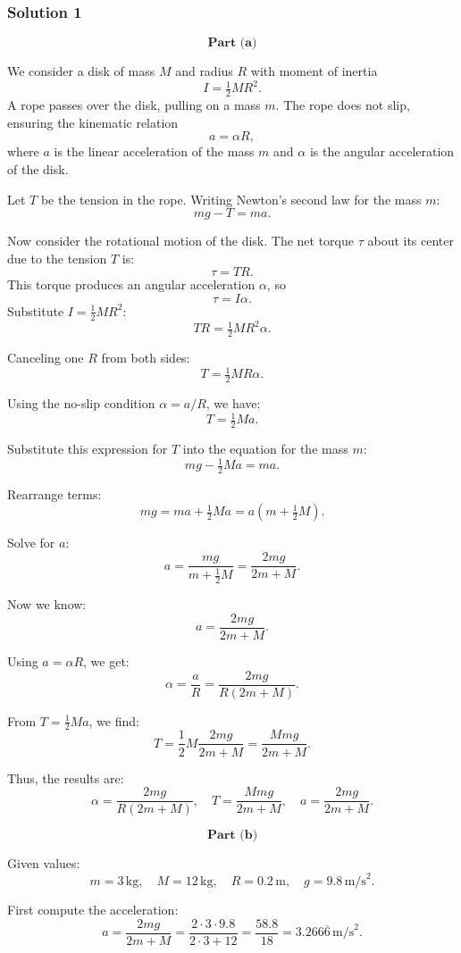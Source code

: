 \documentclass{article}
\begin{document}
\subsubsection{Solution 1}
\[
\textbf{Part (a)}
\]

We consider a disk of mass \(M\) and radius \(R\) with moment of inertia 
\[
I = \tfrac{1}{2} M R^2.
\]
A rope passes over the disk, pulling on a mass \(m\). The rope does not slip, ensuring the kinematic relation 
\[
a = \alpha R,
\]
where \(a\) is the linear acceleration of the mass \(m\) and \(\alpha\) is the angular acceleration of the disk.

Let \(T\) be the tension in the rope. Writing Newton's second law for the mass \(m\):
\[
mg - T = ma.
\]

Now consider the rotational motion of the disk. The net torque \(\tau\) about its center due to the tension \(T\) is:
\[
\tau = T R.
\]
This torque produces an angular acceleration \(\alpha\), so
\[
\tau = I \alpha.
\]
Substitute \(I = \tfrac{1}{2} M R^2\):
\[
T R = \tfrac{1}{2} M R^2 \alpha.
\]

Canceling one \(R\) from both sides:
\[
T = \tfrac{1}{2} M R \alpha.
\]

Using the no-slip condition \(\alpha = a/R\), we have:
\[
T = \tfrac{1}{2} M a.
\]

Substitute this expression for \(T\) into the equation for the mass \(m\):
\[
mg - \tfrac{1}{2} M a = ma.
\]

Rearrange terms:
\[
mg = ma + \tfrac{1}{2} M a = a \left( m + \tfrac{1}{2} M \right).
\]

Solve for \(a\):
\[
a = \frac{mg}{m + \tfrac{1}{2} M} = \frac{2mg}{2m + M}.
\]

Now we know:
\[
a = \frac{2mg}{2m + M}.
\]

Using \(a = \alpha R\), we get:
\[
\alpha = \frac{a}{R} = \frac{2mg}{R(2m + M)}.
\]

From \(T = \tfrac{1}{2} M a\), we find:
\[
T = \frac{1}{2} M \frac{2mg}{2m + M} = \frac{M m g}{2m + M}.
\]

Thus, the results are:
\[
\alpha = \frac{2 m g}{R (2 m + M)}, \quad T = \frac{M m g}{2 m + M}, \quad a = \frac{2 m g}{2 m + M}.
\]

\[
\textbf{Part (b)}
\]

Given values:
\[
m = 3\,\text{kg}, \quad M = 12\,\text{kg}, \quad R = 0.2\,\text{m}, \quad g = 9.8\,\text{m/s}^2.
\]

First compute the acceleration:
\[
a = \frac{2 m g}{2m + M} = \frac{2 \cdot 3 \cdot 9.8}{2 \cdot 3 + 12} = \frac{58.8}{18} = 3.266\overline{6}\,\text{m/s}^2.
\]
\end{document}
